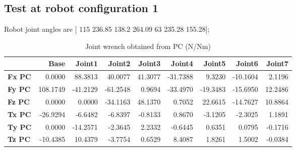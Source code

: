 

\subsection{Test at robot configuration 1}
Robot joint angles are  [ 115        236.85         138.2        264.09            63        235.28        155.28];

\begin{table}[h!]
	\centering
	\caption{Joint wrench obtained from PC (N/Nm)}
	\label{wrech_PC_Pose1}
	\begin{tabular}{|l|r|r|r|r|r|r|r|r|}
		\hline
		\textbf{}  & \textbf{Base} & \textbf{Joint1}  & \textbf{Joint2}  & \textbf{Joint3}  & \textbf{Joint4}  & \textbf{Joint5}  & \textbf{Joint6}  & \textbf{Joint7} \\ \hline
		\textbf{Fx PC}  & 0.0000        & 88.3813        & 40.0077        & 41.3077        & -31.7388        & 9.3230        & -10.1604        & 2.1196 \\ \hline
		\textbf{Fy PC}  & 108.1749        & -41.2129        & -61.2548        & 0.9694        & -33.4970        & -19.3483        & -15.6950        & 12.2486 \\ \hline
		\textbf{Fz PC}  & 0.0000        & 0.0000        & -34.1163        & 48.1370        & 0.7052        & 22.6615        & -14.7627        & 10.8864 \\ \hline
		\textbf{Tx PC}  & -26.9294        & -6.6482        & -6.8397        & -0.8133        & 0.8670        & -3.1205        & -2.3025        & 1.1891 \\ \hline
		\textbf{Ty PC}  & 0.0000        & -14.2571        & -2.3645        & 2.2332        & -0.6445        & 0.6351        & 0.0795        & -0.1716 \\ \hline
		\textbf{Tz PC}  & -10.4385        & 10.4379        & -3.7754        & 0.6529        & 8.4087        & 1.8261        & 1.5002        & -0.0384 \\ \hline
	\end{tabular}
\end{table}

